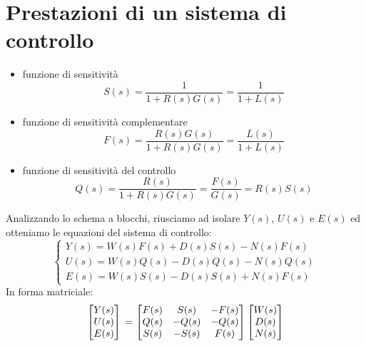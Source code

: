 \documentclass[a4paper]{report}
\begin{document}
\section{Prestazioni di un sistema di controllo}

\begin{itemize}
\item funzione di sensitivit\`a
  \begin{equation}\label{eq:funzioneDiSensitivita}
  S(s) = \dfrac{1}{1 + R(s)G(s)} = \dfrac{1}{1 + L(s)}
  \end{equation}
\item funzione di sensitivit\`a complementare
  \begin{equation}\label{eq:funzioneDiSensitivitaComplementare}
  F(s) = \dfrac{R(s) G(s)}{1 + R(s) G(s)} = \dfrac{L(s)}{1 + L(s)}
  \end{equation}
\item funzione di sensitivit\`a del controllo
  \begin{equation}\label{eq:funzioneDiSensitivitaDiControllore}
  Q(s) = \dfrac{R(s)}{1 + R(s) G(s)} = \dfrac{F(s)}{G(s)} = R(s)S(s)
  \end{equation}
\end{itemize}
Analizzando lo schema a blocchi, riusciamo ad isolare $Y(s)$, $U(s)$ e
$E(s)$ ed otteniamo le equazioni del sistema di controllo:
\begin{equation}\label{eq:sistemaDiControllo}
\left \{
\begin{array}{l}
  Y(s) = W(s)F(s) + D(s)S(s) - N(s)F(s)\\
  U(s) = W(s)Q(s) - D(s)Q(s) - N(s)Q(s)\\
  E(s) = W(s)S(s) - D(s)S(s) + N(s)F(s)
\end{array}
\right .
\end{equation}
In forma matriciale:
\[
  \begin{bmatrix}
    Y(s)\\
    U(s)\\
    E(s)
  \end{bmatrix}\\
  =
  \begin{bmatrix}
    F(s) & S(s) & -F(s)\\
    Q(s) & -Q(s) & -Q(s)\\
    S(s) & -S(s) & F(s)
  \end{bmatrix}
  \begin{bmatrix}
    W(s)\\
    D(s)\\
    N(s)
  \end{bmatrix}
\]
\end{document}
